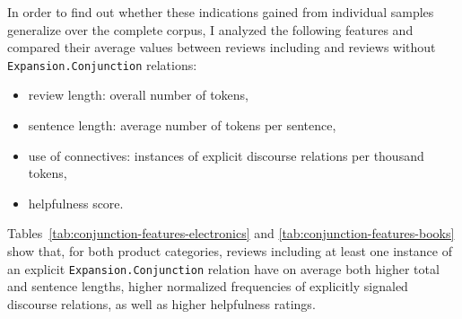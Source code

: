 \documentclass[
    a4paper,%
    12pt,%
    oneside,%
    toc=bibliography,
    final,
]{scrartcl}
\begin{document}
In order to find out whether these indications gained from individual samples generalize over the complete corpus, I analyzed the following features and compared their average values between reviews including and reviews without \lstinline|Expansion.Conjunction| relations:

\begin{itemize}
\item review length: overall number of tokens,
\item sentence length: average number of tokens per sentence,
\item use of connectives: instances of explicit discourse relations per thousand tokens,
\item helpfulness score.
\end{itemize}

Tables~\ref{tab:conjunction-features-electronics} and \ref{tab:conjunction-features-books} show that, for both product categories, reviews including at least one instance of an explicit \lstinline|Expansion.Conjunction| relation have on average both higher total and sentence lengths, higher normalized frequencies of explicitly signaled discourse relations, as well as higher helpfulness ratings.


\begin{table}[h!]
	\centering
	
	\caption{Comparison of selected linguistic features between reviews including and reviews without \lstinline|Expansion.Conjunction| relations in electronics reviews}
	\label{tab:conjunction-features-electronics}
	
	\begin{threeparttable}
	\renewcommand{\arraystretch}{1.5}
	
	\end{threeparttable}

\end{table}
\end{document}

